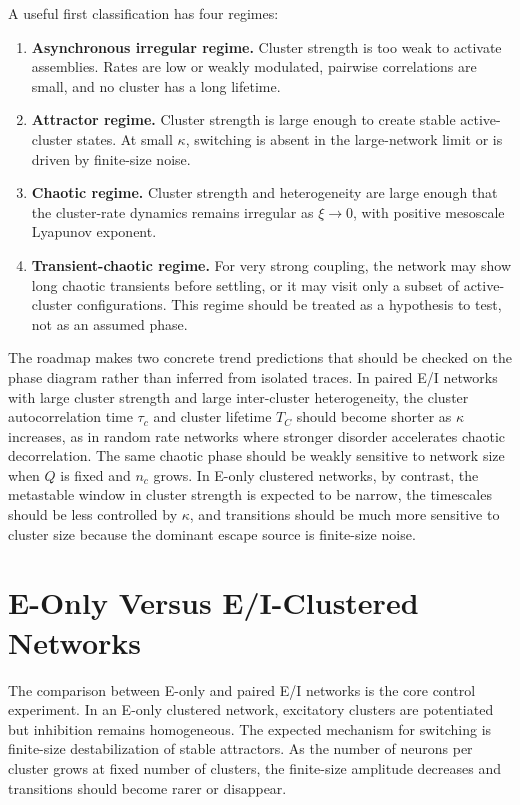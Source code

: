 A useful first classification has four regimes:
\begin{enumerate}
    \item \textbf{Asynchronous irregular regime.} Cluster strength is too weak
    to activate assemblies. Rates are low or weakly modulated, pairwise
    correlations are small, and no cluster has a long lifetime.
    \item \textbf{Attractor regime.} Cluster strength is large enough to create
    stable active-cluster states. At small \(\kappa\), switching is absent in
    the large-network limit or is driven by finite-size noise.
    \item \textbf{Chaotic regime.} Cluster strength and heterogeneity are large
    enough that the cluster-rate dynamics remains irregular as
    \(\xi\to 0\), with positive mesoscale Lyapunov exponent.
    \item \textbf{Transient-chaotic regime.} For very strong coupling, the
    network may show long chaotic transients before settling, or it may visit
    only a subset of active-cluster configurations. This regime should be
    treated as a hypothesis to test, not as an assumed phase.
\end{enumerate}

The roadmap makes two concrete trend predictions that should be checked on the
phase diagram rather than inferred from isolated traces. In paired E/I networks
with large cluster strength and large inter-cluster heterogeneity, the cluster
autocorrelation time \(\tau_c\) and cluster lifetime \(T_C\) should become
shorter as \(\kappa\) increases, as in random rate networks where stronger
disorder accelerates chaotic decorrelation. The same chaotic phase should be weakly
sensitive to network size when \(Q\) is fixed and \(n_c\) grows. In E-only
clustered networks, by contrast, the metastable window in cluster strength is
expected to be narrow, the timescales should be less controlled by \(\kappa\),
and transitions should be much more sensitive to cluster size because the
dominant escape source is finite-size noise.

\section{E-Only Versus E/I-Clustered Networks}
\label{sec:ch10-e-vs-ei}

The comparison between E-only and paired E/I networks is the core control
experiment. In an E-only clustered network, excitatory clusters are potentiated
but inhibition remains homogeneous. The expected mechanism for switching is
finite-size destabilization of stable attractors. As the number of neurons per
cluster grows at fixed number of clusters, the finite-size amplitude decreases
and transitions should become rarer or disappear.


